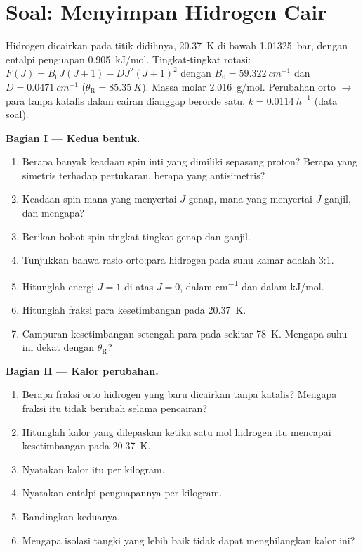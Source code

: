 \section{Soal: Menyimpan Hidrogen Cair}

\begin{problem}
\label{pb:b3:statistical-thermo-applied:1}
Hidrogen dicairkan pada titik didihnya, \qty{20.37}{K} di bawah
\qty{1.01325}{bar}, dengan entalpi penguapan \qty{0.905}{kJ/mol}. Tingkat-tingkat
rotasi: $F(J) = B_0J(J+1) -
D J^2(J+1)^2$ dengan $B_0 = \qty{59.322}{cm^{-1}}$ dan $D = \qty{0.0471}{cm^{-1}}$
($\theta_{\mathrm R} = \qty{85.35}{K}$). Massa molar \qty{2.016}{g/mol}. Perubahan
orto $\to$ para tanpa katalis dalam cairan dianggap berorde satu,
$k = \qty{0.0114}{h^{-1}}$ (data soal).

\medskip\noindent\textbf{Bagian I --- Kedua bentuk.}
\begin{enumerate}[beginpenalty=10000]
  \item Berapa banyak keadaan spin inti yang dimiliki sepasang proton? Berapa
        yang simetris terhadap pertukaran, berapa yang antisimetris?
  \item Keadaan spin mana yang menyertai $J$ genap, mana yang menyertai $J$
        ganjil, dan mengapa?
  \item Berikan bobot spin tingkat-tingkat genap dan ganjil.
  \item Tunjukkan bahwa rasio orto:para hidrogen pada suhu kamar adalah 3:1.
  \item Hitunglah energi $J = 1$ di atas $J = 0$, dalam \unit{cm^{-1}} dan dalam
        \unit{kJ/mol}.
  \item Hitunglah fraksi para kesetimbangan pada \qty{20.37}{K}.
  \item Campuran kesetimbangan setengah para pada sekitar \qty{78}{K}. Mengapa
        suhu ini dekat dengan $\theta_{\mathrm R}$?
\end{enumerate}

\medskip\noindent\textbf{Bagian II --- Kalor perubahan.}
\begin{enumerate}[resume, beginpenalty=10000]
  \item Berapa fraksi orto hidrogen yang baru dicairkan tanpa katalis? Mengapa
        fraksi itu tidak berubah selama pencairan?
  \item Hitunglah kalor yang dilepaskan ketika satu mol hidrogen itu mencapai
        kesetimbangan pada \qty{20.37}{K}.
  \item Nyatakan kalor itu per kilogram.
  \item Nyatakan entalpi penguapannya per kilogram.
  \item Bandingkan keduanya.
  \item Mengapa isolasi tangki yang lebih baik tidak dapat menghilangkan kalor
        ini?
\end{enumerate}


\end{problem}
